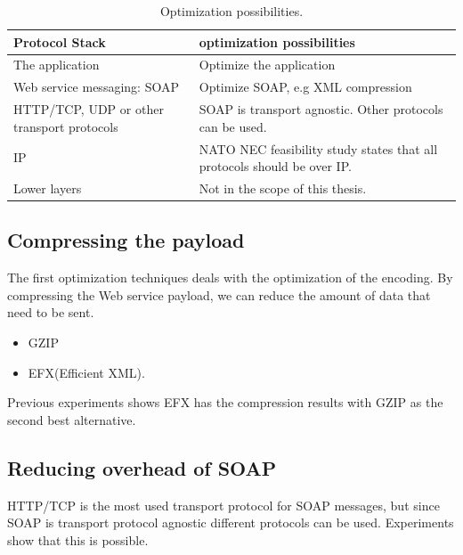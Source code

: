 \documentclass[USenglish]{ifimaster}
\begin{document}
\begin{table}[h]
\begin{tabularx}{\textwidth}{| X | X |}
\hline
  \textbf{Protocol Stack} & \textbf{optimization possibilities} \\ \hline
  The application & Optimize the application\\ \hline
  Web service messaging: SOAP & Optimize SOAP, e.g XML compression \\ \hline
  HTTP/TCP, UDP or other transport protocols & SOAP is transport agnostic. Other
  protocols can be used. \\ \hline
  IP & NATO NEC feasibility study states that all protocols should be over IP. \\
  \hline
  Lower layers & Not in the scope of this thesis. \\ \hline
\end{tabularx}
\caption{Optimization possibilities.} \label{table:optimalization-overview}
\end{table}


\subsection{Compressing the payload}
The first optimization techniques deals with the optimization of the encoding. By compressing the Web service payload, we can reduce the amount of data that need to be sent.
\begin{itemize}
\item GZIP
\item EFX(Efficient XML).
\end{itemize}
Previous experiments shows EFX has the compression results with GZIP as the second best alternative\cite{johnsen-trude-compression-techniqes}.

\subsection{Reducing overhead of SOAP}
HTTP/TCP is the most used transport protocol for SOAP messages, but since SOAP is transport protocol agnostic different protocols can be used. Experiments show that this is possible.
\end{document}
